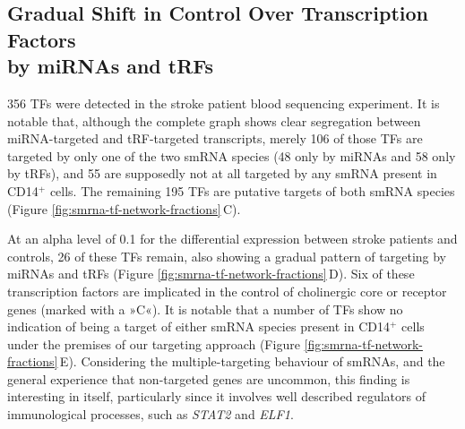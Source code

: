 \subsection{Gradual Shift in Control Over Transcription Factors\\ by miRNAs and tRFs}
356 TFs were detected in the stroke patient blood sequencing experiment. It is notable that, although the complete graph shows clear segregation between miRNA-targeted and tRF-targeted transcripts, merely 106 of those TFs are targeted by only one of the two smRNA species (48 only by miRNAs and 58 only by tRFs), and 55 are supposedly not at all targeted by any smRNA present in CD14$^+$ cells. The remaining 195 TFs are putative targets of both smRNA species (Figure \ref{fig:smrna-tf-network-fractions}\,C). 

At an alpha level of 0.1 for the differential expression between stroke patients and controls, 26 of these TFs remain, also showing a gradual pattern of targeting by miRNAs and tRFs (Figure \ref{fig:smrna-tf-network-fractions}\,D). Six of these transcription factors are implicated in the control of cholinergic core or receptor genes (marked with a »C«). It is notable that a number of TFs show no indication of being a target of either smRNA species present in CD14$^+$ cells under the premises of our targeting approach (Figure \ref{fig:smrna-tf-network-fractions}\,E). Considering the multiple-targeting behaviour of smRNAs, and the general experience that non-targeted genes are uncommon, this finding is interesting in itself, particularly since it involves well described regulators of immunological processes, such as \emph{STAT2} and \emph{ELF1}.

